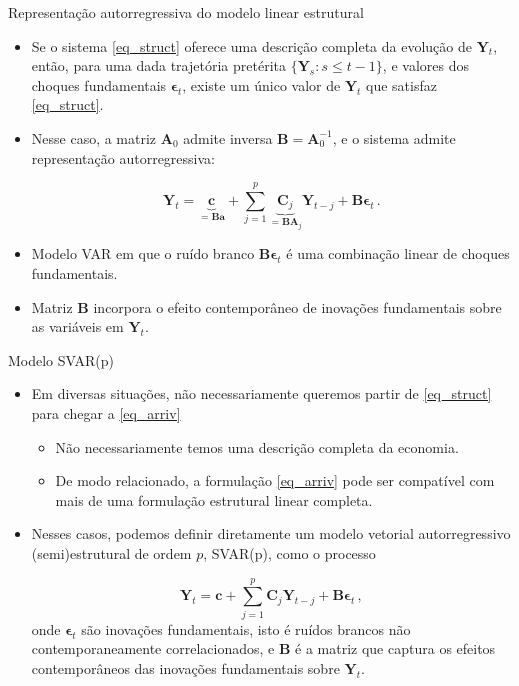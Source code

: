 \documentclass[11pt]{beamer}
\begin{document}
\begin{frame}{Representação autorregressiva do modelo linear estrutural}
	\begin{itemize}
		\item Se o sistema \eqref{eq_struct} oferece uma descrição {\color{blue}completa} da evolução de $\boldsymbol{Y}_t$, então, para uma dada trajetória pretérita $\{\boldsymbol{Y}_s: s \leq t-1\}$, e valores dos choques fundamentais $\boldsymbol{\epsilon}_t$, existe um único valor de $\boldsymbol{Y}_t$  que satisfaz \eqref{eq_struct}.
		\item Nesse caso, a matriz $\boldsymbol{A}_0$ admite inversa $\boldsymbol{B}= \boldsymbol{A}_0^{-1}$, e o sistema admite {\color{blue}representação autorregressiva}:
		
		\begin{equation}
			\label{eq_arriv}
			\boldsymbol{Y}_t = \underbrace{\boldsymbol{c}}_{= \boldsymbol{B}\boldsymbol{a}} + \sum_{j=1}^p \underbrace{\boldsymbol{C}_j}_{=\boldsymbol{B} \boldsymbol{A}_j} \boldsymbol{Y}_{t-j}  + \boldsymbol{B}\boldsymbol{\epsilon}_t\, .
		\end{equation}
		
		\item Modelo VAR em que o ruído branco $\boldsymbol{B}\boldsymbol{\epsilon}_t$ é uma combinação linear de choques fundamentais.
		\item Matriz $\boldsymbol{B}$ incorpora o efeito contemporâneo de inovações fundamentais sobre as variáveis em $\boldsymbol{Y}_t$. 
	\end{itemize}
\end{frame}

\begin{frame}{Modelo SVAR(p)}
\begin{itemize}
	\item 	Em diversas situações, não necessariamente queremos partir de \eqref{eq_struct} para chegar a \eqref{eq_arriv}
	\begin{itemize}
		\item Não necessariamente temos uma descrição completa da economia.
		\item De modo relacionado, a formulação \eqref{eq_arriv} pode ser compatível com mais de uma formulação estrutural linear completa.
	\end{itemize}
	\item Nesses casos, podemos definir diretamente {\color{blue}um modelo vetorial autorregressivo (semi)estrutural de ordem $p$}, SVAR(p), como o processo
	
		\begin{equation}
		\label{eq_svar}
		\boldsymbol{Y}_t = \boldsymbol{c}+ \sum_{j=1}^p \boldsymbol{C}_j \boldsymbol{Y}_{t-j} + \boldsymbol{B}\boldsymbol{\epsilon}_t\, ,
	\end{equation}
	onde $\boldsymbol{\epsilon}_t$ são inovações fundamentais, isto é ruídos brancos não contemporaneamente correlacionados, e $\boldsymbol{B}$ é a matriz que captura os efeitos contemporâneos das inovações fundamentais sobre $\boldsymbol{Y}_t$.
\end{itemize}
\end{frame}
\end{document}
